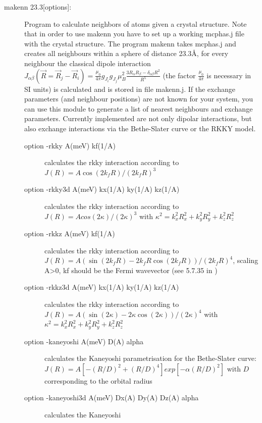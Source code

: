 \begin{description}
\item[\prg makenn 23.3{[options]}:]\label{makenn}  Program to calculate neighbors of atoms given a crystal structure.
Note that in order to use {\prg makenn} you have to set up a 
working {\prg mcphas.j} file with the crystal structure. 
The program {\prg makenn} takes {\prg mcphas.j} and
creates all neighbours within a sphere of distance 23.3\AA, for every neighbour the classical
dipole interaction $J_{\alpha\beta}(\vec R =\vec R_j - \vec R_i)=\frac{\mu_0}{4\pi} g_{J_i} g_{J_j} \mu_B^2 \frac{3R_{\alpha}R_{\beta}-\delta_{\alpha\beta}R^2}{R^5}$
(the factor $\frac{\mu_0}{4\pi}$ is necessary in SI units)
 is calculated and is stored in file {\prg makenn.j}. If the exchange %
parameters 
(and neighbour positions) are not known for your system, you can use this module 
to generate a list of nearest neighbours and exchange parameters. Currently implemented 
 are not only dipolar interactions, but also exchange interactions via the Bethe-Slater 
curve or the RKKY model. 
\begin{description}
\item[option {\prg -rkky A(meV) kf(1/A)}] calculates the rkky interaction according to $J(R)=A %
\cos(2 k_f R)/(2 k_f R)^3$
\item[option {\prg -rkky3d A(meV) kx(1/A) ky(1/A) kz(1/A)}] calculates the rkky interaction %
according to $J(R)=A cos(2 \kappa)/(2 \kappa)^3$ with $\kappa^2=k_x^2 R_x^2 + k_y^2 R_y^2 + %
k_z^2 R_z^2$
\item[option {\prg -rkkz A(meV) kf(1/A)}] calculates the rkky interaction according to $J(R)=A %
(\sin(2 k_f R)- 2 k_f R \cos(2 k_f R))/(2 k_f R)^4$, scaling A>0, kf should be the Fermi wavevector (see 5.7.35 in 
	      \cite{jensen91-1})
\item[option {\prg -rkkz3d A(meV) kx(1/A) ky(1/A) kz(1/A)}] calculates the rkky interaction %
according to $J(R)=A (\sin(2 \kappa)- 2 \kappa \cos(2 \kappa))/(2 \kappa)^4$ with $\kappa^2=k_x^2 %
R_x^2 + k_y^2 R_y^2 + k_z^2 R_z^2$
\item[option {\prg -kaneyoshi A(meV) D(A) alpha}] calculates the Kaneyoshi parametrisation for %
the Bethe-Slater
                               curve: $J(R)= A [-(R/D)^2+(R/D)^4]exp[-\alpha (R/D)^2]$  with $D$ %
corresponding
                               to the orbital radius
\item[option {\prg -kaneyoshi3d A(meV) Dx(A) Dy(A) Dz(A) alpha}] calculates the Kaneyoshi %

\end{description}
\end{description}
